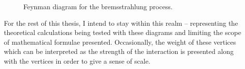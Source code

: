 \begin{figure}
  \centering
  \caption{
    Feynman diagram for the bremsstrahlung process.
  }
  \label{fig:brem-feynman}
\end{figure}

For the rest of this thesis, I intend to stay within this realm -- representing the theoretical
calculations being tested with these diagrams and limiting the scope of mathematical formulae
presented. Occasionally, the weight of these vertices which can be interpreted as the strength
of the interaction is presented along with the vertices in order to give a sense of scale.

